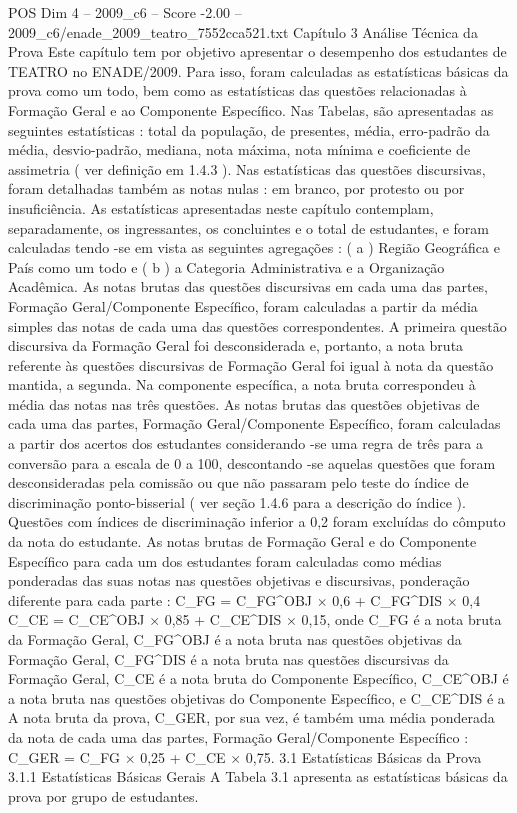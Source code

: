 \begin{textsample}{POS Dim 4 – 2009\_c6 – Score -2.00 – 2009\_c6/enade\_2009\_teatro\_7552cca521.txt}  \label{ex:f4_pos_319}
Capítulo 3 Análise Técnica da Prova Este capítulo tem por objetivo apresentar o desempenho dos estudantes de TEATRO no ENADE/2009.
Para isso, foram calculadas as estatísticas básicas da prova como um todo, bem como as estatísticas das questões relacionadas à Formação Geral e ao Componente Específico.
Nas Tabelas, são apresentadas as seguintes estatísticas : total da população, de presentes, média, erro-padrão da média, desvio-padrão, mediana, nota máxima, nota mínima e coeficiente de assimetria ( ver definição em 1.4.3 ).
Nas estatísticas das questões discursivas, foram detalhadas também as notas nulas : em branco, por protesto ou por insuficiência.
As estatísticas apresentadas neste capítulo contemplam, separadamente, os ingressantes, os concluintes e o total de estudantes, e foram calculadas tendo -se em vista as seguintes agregações : ( a ) Região Geográfica e País como um todo e ( b ) a Categoria Administrativa e a Organização Acadêmica.
As notas brutas das questões discursivas em cada uma das partes, Formação Geral/Componente Específico, foram calculadas a partir da média simples das notas de cada uma das questões correspondentes.
A primeira questão discursiva da Formação Geral foi desconsiderada e, portanto, a nota bruta referente às questões discursivas de Formação Geral foi igual à nota da questão mantida, a segunda.
Na componente específica, a nota bruta correspondeu à média das notas nas três questões.
As notas brutas das questões objetivas de cada uma das partes, Formação Geral/Componente Específico, foram calculadas a partir dos acertos dos estudantes considerando -se uma regra de três para a conversão para a escala de 0 a 100, descontando -se aquelas questões que foram desconsideradas pela comissão ou que não passaram pelo teste do índice de discriminação ponto-bisserial ( ver seção 1.4.6 para a descrição do índice ).
Questões com índices de discriminação inferior a 0,2 foram excluídas do cômputo da nota do estudante.
As notas brutas de Formação Geral e do Componente Específico para cada um dos estudantes foram calculadas como médias ponderadas das suas notas nas questões objetivas e discursivas, ponderação diferente para cada parte : C\_FG = C\_FG\textasciicircum{}OBJ × 0,6 + C\_FG\textasciicircum{}DIS × 0,4 C\_CE = C\_CE\textasciicircum{}OBJ × 0,85 + C\_CE\textasciicircum{}DIS × 0,15, onde C\_FG é a nota bruta da Formação Geral, C\_FG\textasciicircum{}OBJ é a nota bruta nas questões objetivas da Formação Geral, C\_FG\textasciicircum{}DIS é a nota bruta nas questões discursivas da Formação Geral, C\_CE é a nota bruta do Componente Específico, C\_CE\textasciicircum{}OBJ é a nota bruta nas questões objetivas do Componente Específico, e C\_CE\textasciicircum{}DIS é a A nota bruta da prova, C\_GER, por sua vez, é também uma média ponderada da nota de cada uma das partes, Formação Geral/Componente Específico : C\_GER = C\_FG × 0,25 + C\_CE × 0,75. 3.1 Estatísticas Básicas da Prova 3.1.1 Estatísticas Básicas Gerais A Tabela 3.1 apresenta as estatísticas básicas da prova por grupo de estudantes.

\end{textsample}
